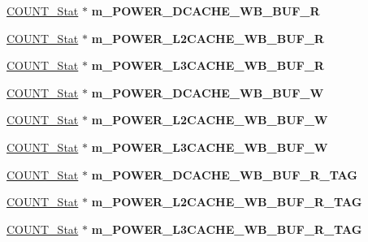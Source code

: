 \begin{DoxyCompactItemize}
\item 
\hypertarget{classall__stats__c_a9c5a4dfae7e02031409dba5e5a05fa23}{
\hyperlink{classCOUNT__Stat}{COUNT\_\-Stat} $\ast$ {\bfseries m\_\-POWER\_\-DCACHE\_\-WB\_\-BUF\_\-R}}
\label{classall__stats__c_a9c5a4dfae7e02031409dba5e5a05fa23}

\item 
\hypertarget{classall__stats__c_a0ca0550b5e33543aaba1bfd414999fa7}{
\hyperlink{classCOUNT__Stat}{COUNT\_\-Stat} $\ast$ {\bfseries m\_\-POWER\_\-L2CACHE\_\-WB\_\-BUF\_\-R}}
\label{classall__stats__c_a0ca0550b5e33543aaba1bfd414999fa7}

\item 
\hypertarget{classall__stats__c_a2c543a105f18c0c97150956669a42a7d}{
\hyperlink{classCOUNT__Stat}{COUNT\_\-Stat} $\ast$ {\bfseries m\_\-POWER\_\-L3CACHE\_\-WB\_\-BUF\_\-R}}
\label{classall__stats__c_a2c543a105f18c0c97150956669a42a7d}

\item 
\hypertarget{classall__stats__c_af4779283ad5828740cc96284860b1e35}{
\hyperlink{classCOUNT__Stat}{COUNT\_\-Stat} $\ast$ {\bfseries m\_\-POWER\_\-DCACHE\_\-WB\_\-BUF\_\-W}}
\label{classall__stats__c_af4779283ad5828740cc96284860b1e35}

\item 
\hypertarget{classall__stats__c_a59c99558ae9d7d89f5a222f1888ec994}{
\hyperlink{classCOUNT__Stat}{COUNT\_\-Stat} $\ast$ {\bfseries m\_\-POWER\_\-L2CACHE\_\-WB\_\-BUF\_\-W}}
\label{classall__stats__c_a59c99558ae9d7d89f5a222f1888ec994}

\item 
\hypertarget{classall__stats__c_a0cc82e7f319c32397d5e47b6bcdf5465}{
\hyperlink{classCOUNT__Stat}{COUNT\_\-Stat} $\ast$ {\bfseries m\_\-POWER\_\-L3CACHE\_\-WB\_\-BUF\_\-W}}
\label{classall__stats__c_a0cc82e7f319c32397d5e47b6bcdf5465}

\item 
\hypertarget{classall__stats__c_a0030fbfce2043e5fd392897475c1d7f4}{
\hyperlink{classCOUNT__Stat}{COUNT\_\-Stat} $\ast$ {\bfseries m\_\-POWER\_\-DCACHE\_\-WB\_\-BUF\_\-R\_\-TAG}}
\label{classall__stats__c_a0030fbfce2043e5fd392897475c1d7f4}

\item 
\hypertarget{classall__stats__c_ace4675573be6baa86a61ac034e5f1d2a}{
\hyperlink{classCOUNT__Stat}{COUNT\_\-Stat} $\ast$ {\bfseries m\_\-POWER\_\-L2CACHE\_\-WB\_\-BUF\_\-R\_\-TAG}}
\label{classall__stats__c_ace4675573be6baa86a61ac034e5f1d2a}

\item 
\hypertarget{classall__stats__c_a14c52d907c4ab16903b1305bcfbc422b}{
\hyperlink{classCOUNT__Stat}{COUNT\_\-Stat} $\ast$ {\bfseries m\_\-POWER\_\-L3CACHE\_\-WB\_\-BUF\_\-R\_\-TAG}}
\label{classall__stats__c_a14c52d907c4ab16903b1305bcfbc422b}


\end{DoxyCompactItemize}
